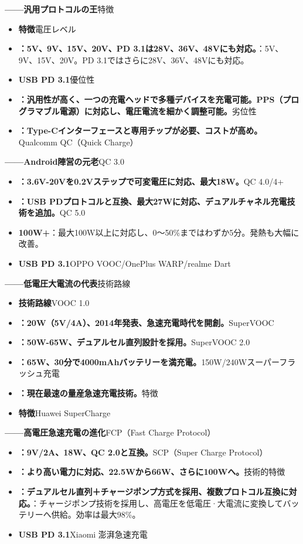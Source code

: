 
\textbf{——汎用プロトコルの王}特徴

\begin{itemize}
  \item \textbf{特徴}電圧レベル
  \item \textbf{：5V、9V、15V、20V、PD 3.1は28V、36V、48Vにも対応。}：5V、9V、15V、20V。PD 3.1ではさらに28V、36V、48Vにも対応。
  \item \textbf{USB PD 3.1}優位性
  \item \textbf{：汎用性が高く、一つの充電ヘッドで多種デバイスを充電可能。PPS（プログラマブル電源）に対応し、電圧電流を細かく調整可能。}劣位性
  \item \textbf{：Type-Cインターフェースと専用チップが必要、コストが高め。}Qualcomm QC（Quick Charge）
\end{itemize}

\textbf{——Android陣営の元老}QC 3.0

\begin{itemize}
  \item \textbf{：3.6V-20Vを0.2Vステップで可変電圧に対応、最大18W。}QC 4.0/4+
  \item \textbf{：USB PDプロトコルと互換、最大27Wに対応、デュアルチャネル充電技術を追加。}QC 5.0
  \item \textbf{100W+}：最大100W以上に対応し、0〜50\%まではわずか5分。発熱も大幅に改善。
  \item \textbf{USB PD 3.1}OPPO VOOC/OnePlus WARP/realme Dart
\end{itemize}

\textbf{——低電圧大電流の代表}技術路線

\begin{itemize}
  \item \textbf{技術路線}VOOC 1.0
  \item \textbf{：20W（5V/4A）、2014年発表、急速充電時代を開創。}SuperVOOC
  \item \textbf{：50W-65W、デュアルセル直列設計を採用。}SuperVOOC 2.0
  \item \textbf{：65W、30分で4000mAhバッテリーを満充電。}150W/240Wスーパーフラッシュ充電
  \item \textbf{：現在最速の量産急速充電技術。}特徴
  \item \textbf{特徴}Huawei SuperCharge
\end{itemize}

\textbf{——高電圧急速充電の進化}FCP（Fast Charge Protocol）

\begin{itemize}
  \item \textbf{：9V/2A、18W、QC 2.0と互換。}SCP（Super Charge Protocol）
  \item \textbf{：より高い電力に対応、22.5Wから66W、さらに100Wへ。}技術的特徴
  \item \textbf{：デュアルセル直列＋チャージポンプ方式を採用、複数プロトコル互換に対応。}：チャージポンプ技術を採用し、高電圧を低電圧·大電流に変換してバッテリーへ供給。効率は最大98\%。
  \item \textbf{USB PD 3.1}Xiaomi 澎湃急速充電
\end{itemize}


